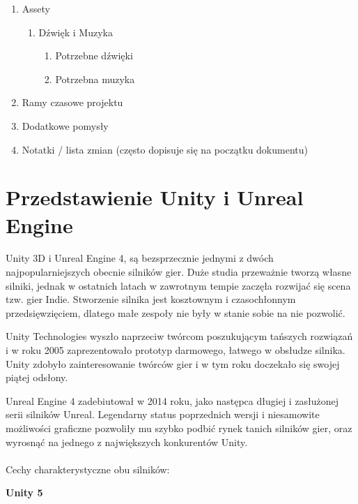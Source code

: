 \documentclass[12pt]{xmgr}
\begin{document}
\begin{enumerate}
\begin{enumerate}
  \end{enumerate}
  \item Assety
  \begin{enumerate}
    \item Dźwięk i Muzyka
    \begin{enumerate}
      \item Potrzebne dźwięki
      \item Potrzebna muzyka
    \end{enumerate}
  \end{enumerate}
  \item Ramy czasowe projektu
  \item Dodatkowe pomysły
  \item Notatki / lista zmian (często dopisuje się na początku dokumentu)	
\end{enumerate}

\chapter{Przedstawienie Unity i Unreal Engine}

Unity 3D i Unreal Engine 4, są bezsprzecznie jednymi z dwóch najpopularniejszych obecnie silników gier. Duże studia przeważnie tworzą własne silniki, jednak  w ostatnich latach w zawrotnym tempie zaczęła rozwijać się scena tzw. gier Indie. Stworzenie silnika jest kosztownym i czasochłonnym przedsięwzięciem, dlatego małe zespoły nie były w stanie sobie na nie pozwolić.

Unity Technologies wyszło naprzeciw twórcom poszukującym tańszych rozwiązań i w roku 2005 zaprezentowało prototyp darmowego, łatwego w obsłudze silnika. Unity zdobyło zainteresowanie twórców gier i w tym roku doczekało się swojej piątej odsłony.

Unreal Engine 4 zadebiutował w 2014 roku, jako następca długiej i zasłużonej serii silników Unreal. Legendarny status poprzednich wersji i niesamowite możliwości graficzne pozwoliły mu szybko podbić rynek tanich silników gier, oraz wyrosnąć na jednego z największych konkurentów Unity.
\\
\\
Cechy charakterystyczne obu silników:

\textbf{Unity 5}
\end{document}

